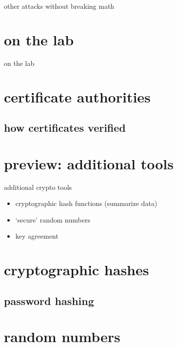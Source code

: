 \begin{frame}{other attacks without breaking math}
\end{frame}



\section{on the lab}
\begin{frame}{on the lab}
\end{frame}

\section{certificate authorities}



\subsection{how certificates verified}


\section{preview: additional tools}
\begin{frame}{additional crypto tools}
    \begin{itemize}
    \item cryptographic hash functions (summarize data)
    \item `secure' random numbers
    \item key agreement
    \end{itemize}
\end{frame}

\section{cryptographic hashes}



\subsection{password hashing}



\section{random numbers}


